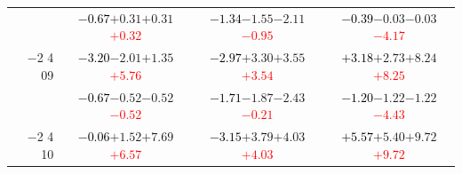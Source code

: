 \documentclass[compress]{beamer}
\begin{document}
\begin{frame}
\begin{tabular}{r | c | c | c}
          & \textcolor{black}{$-0.67$}\hspace{0.1 cm}$+0.31$\hspace{0.1 cm}$+0.31$\hspace{0.1 cm}\textcolor{red}{$+0.32$} & \textcolor{black}{$-1.34$}\hspace{0.1 cm}$-1.55$\hspace{0.1 cm}$-2.11$\hspace{0.1 cm}\textcolor{red}{$-0.95$} & \textcolor{black}{$-0.39$}\hspace{0.1 cm}$-0.03$\hspace{0.1 cm}$-0.03$\hspace{0.1 cm}\textcolor{red}{$-4.17$} \\
$-$2 4 09 & \textcolor{black}{$-3.20$}\hspace{0.1 cm}$-2.01$\hspace{0.1 cm}$+1.35$\hspace{0.1 cm}\textcolor{red}{$+5.76$} & \textcolor{black}{$-2.97$}\hspace{0.1 cm}$+3.30$\hspace{0.1 cm}$+3.55$\hspace{0.1 cm}\textcolor{red}{$+3.54$} & \textcolor{black}{$+3.18$}\hspace{0.1 cm}$+2.73$\hspace{0.1 cm}$+8.24$\hspace{0.1 cm}\textcolor{red}{$+8.25$} \\
          & \textcolor{black}{$-0.67$}\hspace{0.1 cm}$-0.52$\hspace{0.1 cm}$-0.52$\hspace{0.1 cm}\textcolor{red}{$-0.52$} & \textcolor{black}{$-1.71$}\hspace{0.1 cm}$-1.87$\hspace{0.1 cm}$-2.43$\hspace{0.1 cm}\textcolor{red}{$-0.21$} & \textcolor{black}{$-1.20$}\hspace{0.1 cm}$-1.22$\hspace{0.1 cm}$-1.22$\hspace{0.1 cm}\textcolor{red}{$-4.43$} \\
$-$2 4 10 & \textcolor{black}{$-0.06$}\hspace{0.1 cm}$+1.52$\hspace{0.1 cm}$+7.69$\hspace{0.1 cm}\textcolor{red}{$+6.57$} & \textcolor{black}{$-3.15$}\hspace{0.1 cm}$+3.79$\hspace{0.1 cm}$+4.03$\hspace{0.1 cm}\textcolor{red}{$+4.03$} & \textcolor{black}{$+5.57$}\hspace{0.1 cm}$+5.40$\hspace{0.1 cm}$+9.72$\hspace{0.1 cm}\textcolor{red}{$+9.72$} \\

\end{tabular}
\end{frame}
\end{document}
